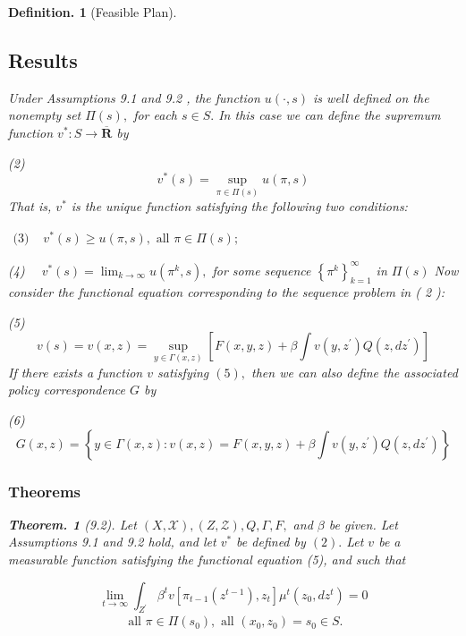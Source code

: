 \documentclass{article}
\newtheorem{defin}{Definition.}
\newtheorem{teo}{Theorem. }
\theoremstyle{definition}
\begin{document}
\begin{defin}[Feasible Plan]
\begin{itemize}
\end{itemize}



\subsection{Results}

Under Assumptions 9.1 and 9.2 , the function $u(\cdot, s)$ is well defined on the nonempty set $\Pi(s),$ for each $s \in S .$ In this case we can define the supremum function $v^{*}: S \rightarrow \overline{\mathbf{R}}$ by

(2)
$$
v^{*}(s)=\sup _{\pi \in \Pi(s)} u(\pi, s)
$$
That is, $v^{*}$ is the unique function satisfying the following two conditions:

$\begin{array}{ll}\text {(3) } & v^{*}(s) \geq u(\pi, s), \text { all } \pi \in \Pi(s) ;\end{array}$

(4) $\quad v^{*}(s)=\lim _{k \rightarrow \infty} u\left(\pi^{k}, s\right),$ for some sequence
$\left\{\pi^{k}\right\}_{k=1}^{\infty}$ in $\Pi(s)$
Now consider the functional equation corresponding to the sequence problem in ( 2 ):

(5)
$$
v(s)=v(x, z)=\sup _{y \in \Gamma(x, z)}\left[F(x, y, z)+\beta \int v\left(y, z^{\prime}\right) Q\left(z, d z^{\prime}\right)\right]
$$
If there exists a function $v$ satisfying $(5),$ then we can also define the associated policy correspondence $G$ by

(6)
$$
G(x, z)=\left\{y \in \Gamma(x, z): v(x, z)=F(x, y, z)+\beta \int v\left(y, z^{\prime}\right) Q\left(z, d z^{\prime}\right)\right\}
$$

\subsubsection{Theorems}
\begin{teo} [9.2]
Let $(X, \mathscr{X}),(Z, \mathscr{Z}), Q, \Gamma, F,$ and $\beta$ be given. Let Assumptions
9.1 and 9.2 hold, and let $v^{*}$ be defined by $(2) .$ Let $v$ be a measurable function satisfying the functional equation (5), and such that

$$
\lim _{t \rightarrow \infty} \int_{Z^{\prime}} \beta^{t} v\left[\pi_{t-1}\left(z^{t-1}\right), z_{t}\right] \mu^{t}\left(z_{0}, d z^{t}\right)=0
$$
$$
\begin{array}{l}
\text { all } \pi \in \Pi\left(s_{0}\right), \text { all }\left(x_{0}, z_{0}\right)=s_{0} \in S . \\
\end{array}
$$


\end{teo}
\end{defin}
\end{document}
